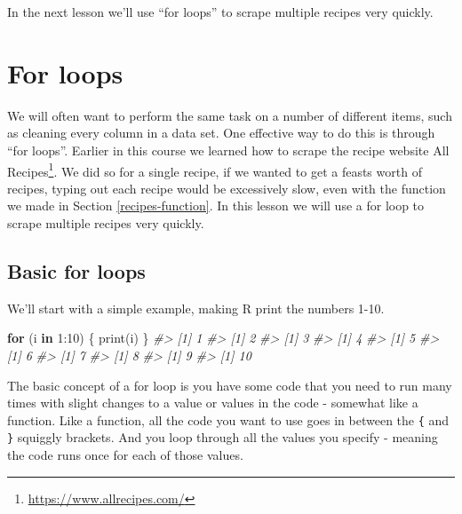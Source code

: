 \documentclass[
]{krantz}
\makeatletter
\newenvironment{Shaded}{\begin{snugshade}}{\end{snugshade}}
\newcommand{\CommentTok}[1]{\textcolor[rgb]{0.37,0.37,0.37}{\textit{#1}}}
\newcommand{\ControlFlowTok}[1]{\textcolor[rgb]{0.27,0.27,0.27}{\textbf{#1}}}
\newcommand{\DecValTok}[1]{\textcolor[rgb]{0.06,0.06,0.06}{#1}}
\newcommand{\FunctionTok}[1]{\textcolor[rgb]{0,0,0}{#1}}
\newcommand{\NormalTok}[1]{#1}
\newcommand{\SpecialCharTok}[1]{\textcolor[rgb]{0,0,0}{#1}}
\renewcommand{\href}[2]{#2\footnote{\url{#1}}}
\newenvironment{kframe}{%
\medskip{}
\setlength{\fboxsep}{.8em}
 \def\at@end@of@kframe{}%
 \ifinner\ifhmode%
  \def\at@end@of@kframe{\end{minipage}}%
  \begin{minipage}{\columnwidth}%
 \fi\fi%
 \def\FrameCommand##1{\hskip\@totalleftmargin \hskip-\fboxsep
 \colorbox{shadecolor}{##1}\hskip-\fboxsep
     \hskip-\linewidth \hskip-\@totalleftmargin \hskip\columnwidth}%
 \MakeFramed {\advance\hsize-\width
   \@totalleftmargin\z@ \linewidth\hsize
   \@setminipage}}%
 {\par\unskip\endMakeFramed%
 \at@end@of@kframe}
\renewenvironment{Shaded}{\begin{kframe}}{\end{kframe}}
\makeatother
\begin{document}
In the next lesson we'll use ``for loops'' to scrape multiple recipes very quickly.

\hypertarget{for-loops}{%
\chapter{For loops}\label{for-loops}}

We will often want to perform the same task on a number of different items, such as cleaning every column in a data set. One effective way to do this is through ``for loops''. Earlier in this course we learned how to scrape the recipe website \href{https://www.allrecipes.com/}{All Recipes}. We did so for a single recipe, if we wanted to get a feasts worth of recipes, typing out each recipe would be excessively slow, even with the function we made in Section \ref{recipes-function}. In this lesson we will use a for loop to scrape multiple recipes very quickly.

\hypertarget{basic-for-loops}{%
\section{Basic for loops}\label{basic-for-loops}}

We'll start with a simple example, making R print the numbers 1-10.

\begin{Shaded}
\begin{Highlighting}[]
\ControlFlowTok{for}\NormalTok{ (i }\ControlFlowTok{in} \DecValTok{1}\SpecialCharTok{:}\DecValTok{10}\NormalTok{) \{}
  \FunctionTok{print}\NormalTok{(i)}
\NormalTok{\}}
\CommentTok{\#\textgreater{} [1] 1}
\CommentTok{\#\textgreater{} [1] 2}
\CommentTok{\#\textgreater{} [1] 3}
\CommentTok{\#\textgreater{} [1] 4}
\CommentTok{\#\textgreater{} [1] 5}
\CommentTok{\#\textgreater{} [1] 6}
\CommentTok{\#\textgreater{} [1] 7}
\CommentTok{\#\textgreater{} [1] 8}
\CommentTok{\#\textgreater{} [1] 9}
\CommentTok{\#\textgreater{} [1] 10}
\end{Highlighting}
\end{Shaded}

The basic concept of a for loop is you have some code that you need to run many times with slight changes to a value or values in the code - somewhat like a function. Like a function, all the code you want to use goes in between the \texttt{\{} and \texttt{\}} squiggly brackets. And you loop through all the values you specify - meaning the code runs once for each of those values.
\end{document}
